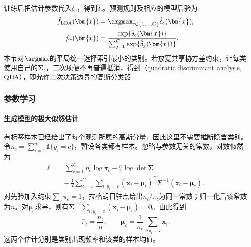 训练后把估计参数代入$\delta_c$，得到$\hat{\delta}_c$。预测规则及相应的模型后验为
\begin{equation}
  \label{eq:classification-lda-prediction}
  \begin{aligned}
    \hat f_{\mathrm{LDA}}(\bm{x})
      &=\argmax_{c\in\{1,\ldots,C\}}\hat{\delta}_c(\bm{x}),\\
    \hat p_c(\bm{x})
      &=\frac{\exp\{\hat{\delta}_c(\bm{x})\}}
        {\sum_{j=1}^{C}\exp\{\hat{\delta}_j(\bm{x})\}} .
  \end{aligned}
\end{equation}
本节对$\argmax$的平局统一选择索引最小的类别。若放宽共享协方差约束，让每类使用自己的$\bm{\Sigma}_c$，二次项便不再普遍抵消，得到（quadratic discriminant analysis, QDA），即允许二次决策边界的高斯分类器

\subsubsection{参数学习}
\label{sec:classification-lda-learning}

\paragraph{生成模型的极大似然估计}
有标签样本已经给出了每个观测所属的高斯分量，因此这里不需要推断隐含类别。令$n_c=\sum_{i=1}^{n}\mathbb{1}\{y_i=c\}$，暂设各类都有样本。忽略与参数无关的常数，对数似然为
\begin{equation}
  \label{eq:classification-lda-likelihood}
  \begin{aligned}
    \ell
      &=\sum_{c=1}^{C}n_c\log\pi_c
        -\frac n2\log\det\bm{\Sigma}\\
      &\quad-\frac12\sum_{c=1}^{C}\sum_{i:y_i=c}
        (\bm{x}_i-\bm{\mu}_c)^{\top}
        \bm{\Sigma}^{-1}(\bm{x}_i-\bm{\mu}_c).
  \end{aligned}
\end{equation}
对先验加入约束$\sum_c\pi_c=1$，拉格朗日驻点给出$n_c/\pi_c$为同一常数；归一化后该常数为$n$。对$\bm{\mu}_c$求导，则有$\bm{\Sigma}^{-1}\sum_{i:y_i=c}(\bm{x}_i-\bm{\mu}_c)=\bm{0}$。由此得到
\begin{equation}
  \label{eq:classification-lda-mean-prior}
  \hat\pi_c=\frac{n_c}{n},\qquad
  \hat{\bm{\mu}}_c=\frac1{n_c}\sum_{i:y_i=c}\bm{x}_i .
\end{equation}
这两个估计分别是类别出现频率和该类的样本均值。

